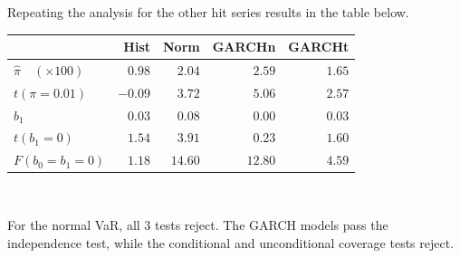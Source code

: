 \documentclass[11pt, a4paper]{article}
\begin{document}
\begin{enumerate}
Repeating the analysis for the
other hit series results in the table below.
\begin{center}
\begin{tabular}{l|rrrr}
\toprule
& Hist & Norm &  GARCHn & GARCHt \\ \midrule
$\hat{\pi}\quad (\times 100)$ & $0.98$ & $2.04$ & $2.59$ & $1.65$\\
$t(\pi =0.01)$ & $-0.09$ & $3.72$ & $5.06$ & $2.57$ \\
$\hat{b}_{1}$ & $0.03$ & $0.08$ & $0.00$ & $0.03$\\
$t(b_{1}=0)$ & $1.54$ & $3.91$ & $0.23$ & $1.60$  \\
$F(b_{0}=b_{1}=0)$ & $1.18$ & $14.60$ & $12.80$ & $4.59$\\ \bottomrule
\end{tabular}\\
\end{center}
For the normal VaR, all 3 tests reject. The GARCH models pass the independence test, while the conditional and unconditional coverage tests reject.
\end{enumerate}
\end{document}
